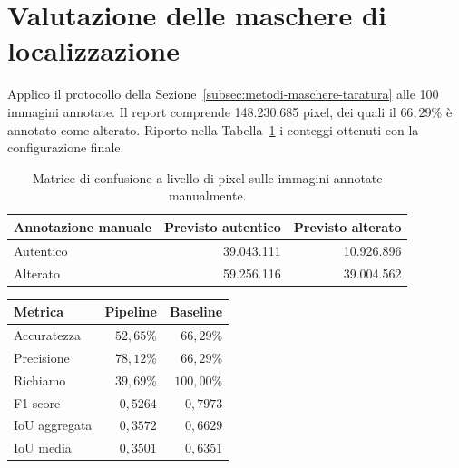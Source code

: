 \newpage
\section{Valutazione delle maschere di localizzazione}
\label{sec:risultati-maschere}

Applico il protocollo della Sezione~\ref{subsec:metodi-maschere-taratura} alle 100 immagini annotate. Il report  comprende 148.230.685 pixel, dei quali il $66{,}29\%$ è annotato come alterato. Riporto nella Tabella~\ref{tab:risultati-maschere-confusione} i conteggi ottenuti con la configurazione finale.

\begin{table}[htbp]
    \centering
    \small
    \caption{Matrice di confusione a livello di pixel sulle immagini annotate manualmente.}
    \label{tab:risultati-maschere-confusione}
    \begin{tabular}{@{}lrr@{}}
        \toprule
        Annotazione manuale & Previsto autentico & Previsto alterato \\
        \midrule
        Autentico & 39.043.111 & 10.926.896 \\
        Alterato & 59.256.116 & 39.004.562 \\
        \bottomrule
    \end{tabular}
\end{table}

\bigskip\noindent
\begin{minipage}{\linewidth}
    \centering
    \small
    \makeatletter{}\makeatother
    \caption{Prestazioni della pipeline e della baseline che seleziona tutti i pixel. Fonte: \texttt{mask\_confusion\_matrix.txt}}
    \label{tab:risultati-maschere-metriche}
    \begin{tabular}{@{}lrr@{}}
        \toprule
        Metrica & Pipeline & Baseline \\
        \midrule
        Accuratezza & $52{,}65\%$ & $66{,}29\%$ \\
        Precisione & $78{,}12\%$ & $66{,}29\%$ \\
        Richiamo & $39{,}69\%$ & $100{,}00\%$ \\
        F1-score & $0{,}5264$ & $0{,}7973$ \\
        IoU aggregata & $0{,}3572$ & $0{,}6629$ \\
        IoU media & $0{,}3501$ & $0{,}6351$ \\
        \bottomrule
    \end{tabular}
\end{minipage}
\bigskip


